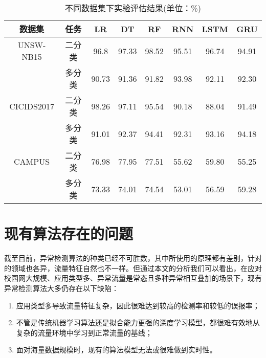 \begin{table*}[h]
    \small
    \caption{不同数据集下实验评估结果(单位：\%)}
    \label{不同数据集下实验评估结果}
    \centering
    \begin{tabular}{c|c|ccc|ccc}
    \toprule
    
     数据集 &  任务  &  
     LR &  DT & RF & RNN & LSTM & GRU  \\
    \midrule
    
    UNSW-NB15 & 二分类 & 96.8 & 97.33 & 98.52 &  95.51 & 96.74 & 94.91  \\ 
    
    & 多分类 &90.73 & 91.36 & 91.82 & 93.98 & 92.11 & 92.30  \\
    
    \midrule
    CICIDS2017 & 二分类 & 98.26 & 97.11 & 95.54 & 90.18 & 88.04 & 91.49  \\
    & 多分类 & 91.01 & 92.37 & 94.41 & 92.31 & 93.16 & 94.18 \\
    \midrule
    CAMPUS & 二分类 & 76.98 & 77.95 & 77.51 & 55.62 & 59.80 & 55.25 \\
    & 多分类 & 73.33 & 74.01 & 74.54 & 53.01 & 56.59 & 59.28 \\
   
     \bottomrule
    
    \end{tabular}
    \end{table*}


\section{现有算法存在的问题}
截至目前，异常检测算法的种类已经不可胜数，其中所使用的原理都有差别，针对的领域也各异，流量特征自然也不一样。但通过本文的分析我们可以看出，在应对校园网大规模、应用类型多、异常流量是常态且多种异常相互叠加的场景下，现有异常检测算法大多仍存在以下缺陷：

\begin{enumerate}
  \item 应用类型多导致流量特征复杂，因此很难达到较高的检测率和较低的误报率；
  \item 不管是传统机器学习算法还是拟合能力更强的深度学习模型，都很难有效地从复杂的流量环境中学习到正常流量的基线；
  \item 面对海量数据规模时，现有的算法模型无法或很难做到实时性。
\end{enumerate}


